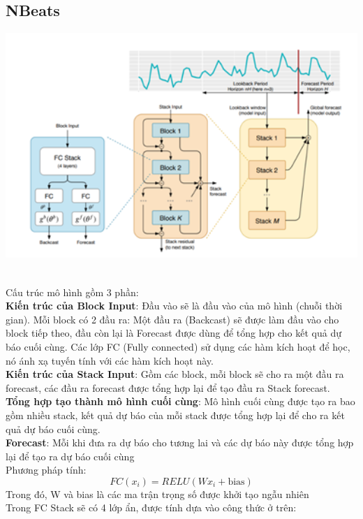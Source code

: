 \subsection{NBeats}
\begin{minipage}{0.45\textwidth}
\centering
\includegraphics[width=1\textwidth]{resources/chapter-4/nbeats-1.png}
\end{minipage}
\\
Cấu trúc mô hình gồm 3 phần: \\
\textbf{Kiến trúc của Block Input}: Đầu vào sẽ là đầu vào của mô hình (chuỗi thời gian). Mỗi block có 2 đầu ra: Một đầu ra (Backcast) sẽ được làm đầu vào cho block tiếp theo, đầu còn lại là Forecast được dùng để tổng hợp cho kết quả dự báo cuối cùng. Các lớp FC (Fully connected) sử dụng các hàm kích hoạt để học, nó ánh xạ tuyến tính với các hàm kích hoạt này.\\
\textbf{Kiến trúc của Stack Input}: Gồm các block, mỗi block sẽ cho ra một đầu ra forecast, các đầu ra forecast được tổng hợp lại để tạo đầu ra Stack forecast.\\
\textbf{Tổng hợp tạo thành mô hình cuối cùng}: Mô hình cuối cùng được tạo ra bao gồm nhiều stack, kết quả dự báo của mỗi stack được tổng hợp lại để cho ra kết quả dự báo cuối cùng.\\
\textbf{Forecast}: Mỗi khi đưa ra dự báo cho tương lai và các dự báo này được tổng hợp lại để tạo ra dự báo cuối cùng\\
Phương pháp tính:
\[FC(x_i) = RELU(Wx_i + \text{bias})\]
Trong đó, W và bias là các ma trận trọng số được khởi tạo ngẫu nhiên\\
Trong FC Stack sẽ có 4 lớp ẩn, được tính dựa vào công thức ở trên:

